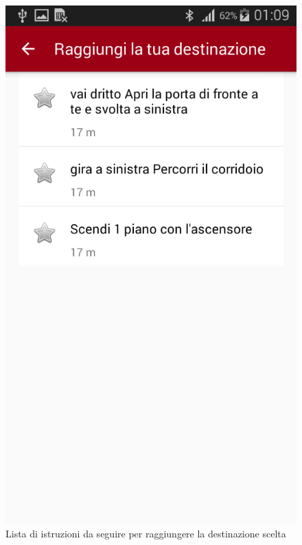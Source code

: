 \documentclass[../ClipsManualeUtente.tex]{subfiles}
\begin{document}
\begin{enumerate}
		\begin{figure} [h]
			\centering
			\includegraphics[scale=0.2]{img/ListaIstruzioni}
			\caption{Lista di istruzioni da seguire per raggiungere la destinazione scelta}
			\label{fig:ListaIstruzioni}
		\end{figure}	
		
	\end{enumerate}
\end{document}
